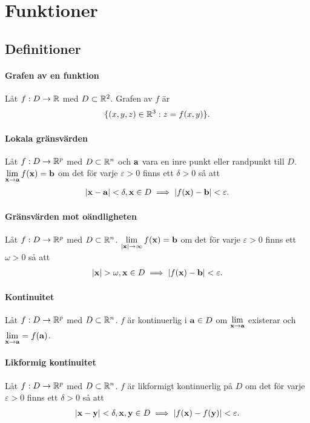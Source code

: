 \section{Funktioner}

\subsection{Definitioner}

\paragraph{Grafen av en funktion}
Låt $f: D\to\mathbb{R}$ med $D\subset\mathbb{R}^2$. Grafen av $f$ är
\begin{align*}
	\{(x, y, z)\in\mathbb{R}^3: z = f(x, y)\}.
\end{align*}

\paragraph{Lokala gränsvärden}
Låt $f: D\to\mathbb{R}^p$ med $D\subset\mathbb{R}^n$ och $\vect{a}$ vara en inre punkt eller randpunkt till $D$. $\limit{\vect{x}}{\vect{a}}f(\vect{x}) = \vect{b}$ om det för varje $\varepsilon > 0$ finns ett $\delta > 0$ så att
\begin{align*}
	\abs{\vect{x} - \vect{a}} < \delta, \vect{x}\in D \implies\abs{f(\vect{x}) - \vect{b}} < \varepsilon.
\end{align*}

\paragraph{Gränsvärden mot oändligheten}
Låt $f: D\to\mathbb{R}^p$ med $D\subset\mathbb{R}^n$. $\limit{\abs{\vect{x}}}{\infty}f(\vect{x}) = \vect{b}$ om det för varje $\varepsilon > 0$ finns ett $\omega > 0$ så att
\begin{align*}
	\abs{\vect{x}} > \omega, \vect{x}\in D \implies\abs{f(\vect{x}) - \vect{b}} < \varepsilon.
\end{align*}

\paragraph{Kontinuitet}
Låt $f: D\to\mathbb{R}^p$ med $D\subset\mathbb{R}^n$. $f$ är kontinuerlig i $\vect{a}\in D$ om $\limit{\vect{x}}{\vect{a}}$ existerar och $\limit{\vect{x}}{\vect{a}} = f(\vect{a})$.

\paragraph{Likformig kontinuitet}
Låt $f: D\to\mathbb{R}^p$ med $D\subset\mathbb{R}^n$. $f$ är likformigt kontinuerlig på $D$ om det för varje $\varepsilon > 0$ finns ett $\delta > 0$ så att
\begin{align*}
	\abs{\vect{x} - \vect{y}} < \delta, \vect{x}, \vect{y}\in D \implies\abs{f(\vect{x}) - f(\vect{y})} < \varepsilon.
\end{align*}

